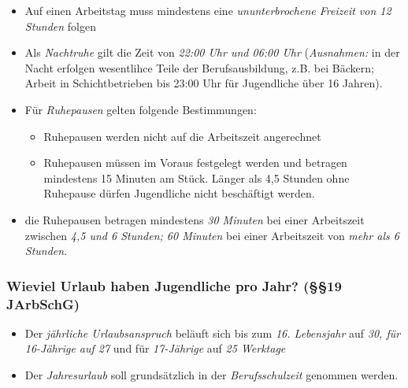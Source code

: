 \documentclass[a4paper, 12pt]{report}
\begin{document}
\begin{multicols}{2}
\begin{itemize}
    \item Auf einen Arbeitstag muss mindestens eine \emph{ununterbrochene
	Freizeit von 12 Stunden} folgen
    \item Als \emph{Nachtruhe} gilt die Zeit von \emph{22:00 Uhr und 06:00 Uhr}
	(\emph{Ausnahmen:} in der Nacht erfolgen wesentlihce Teile der
	Berufsausbildung, z.B. bei Bäckern; Arbeit in Schichtbetrieben bis
	23:00 Uhr für Jugendliche über 16 Jahren).
    \item Für \emph{Ruhepausen} gelten folgende Bestimmungen:
	\begin{itemize}
	    \item Ruhepausen werden nicht auf die Arbeitszeit angerechnet
	    \item Ruhepausen müssen im Voraus festgelegt werden und betragen
		mindestens 15 Minuten am Stück. Länger als 4,5 Stunden ohne
		Ruhepause dürfen Jugendliche nicht beschäftigt werden.
	\end{itemize}
    \item die Ruhepausen betragen mindestens \emph{30 Minuten} bei einer
	Arbeitszeit zwischen \emph{4,5 und 6 Stunden; 60 Minuten} bei einer
	Arbeitszeit von \emph{mehr als 6 Stunden}.
\end{itemize}

\subsubsection{Wieviel Urlaub haben Jugendliche pro Jahr? (\S\S 19 JArbSchG)}

\begin{itemize}
    \item Der \emph{jährliche Urlaubsanspruch} beläuft sich bis zum
	\emph{16. Lebensjahr} auf \emph{30, für 16-Jährige auf 27} und für
	\emph{17-Jährige} auf \emph{25 Werktage}
    \item Der \emph{Jahresurlaub} soll grundsätzlich in der
	\emph{Berufsschulzeit} genommen werden.
\end{itemize}


\end{multicols}
\end{document}

